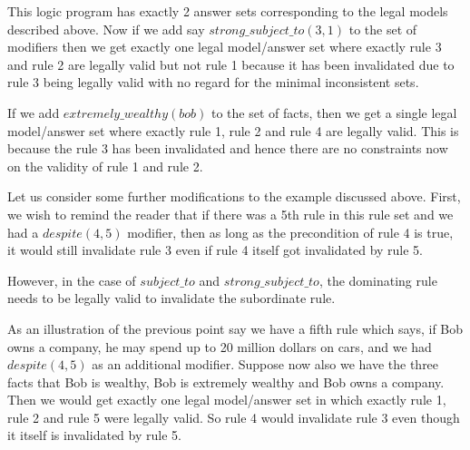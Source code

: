 This logic program has exactly 2 answer sets corresponding to the legal models described above. Now if we add say $strong\_subject\_to(3,1)$ to the set of modifiers then we get exactly one legal model/answer set where exactly rule 3 and rule 2 are legally valid but not rule 1 because it has been invalidated due to rule 3 being legally valid with no regard for the minimal inconsistent sets.

If we add $extremely\_wealthy(bob)$ to the set of facts, then we get a single legal model/answer set where exactly rule 1, rule 2 and rule 4 are legally valid. This is because the rule 3 has been invalidated and hence there are no constraints now on the validity of rule 1 and rule 2. 

Let us consider some further modifications to the example discussed above. First, we wish to remind the reader that if there was a 5th rule in this rule set and we had a $despite(4,5)$ modifier, then as long as the precondition of rule 4 is true, it would still invalidate rule 3 even if rule 4 itself got invalidated by rule 5.

However, in the case of $subject\_to$ and $strong\_subject\_to$, the dominating rule needs to be legally valid to invalidate the subordinate rule. 

As an illustration of the previous point say we have a fifth rule which says, if Bob owns a company, he may spend up to 20 million dollars on cars, and we had $despite(4,5)$ as an additional modifier. Suppose now also we have the three facts that Bob is wealthy, Bob is extremely wealthy and Bob owns a company. Then we would get exactly one legal model/answer set in which exactly rule 1, rule 2 and rule 5 were legally valid. So rule 4 would invalidate rule 3 even though it itself is invalidated by rule 5. 





